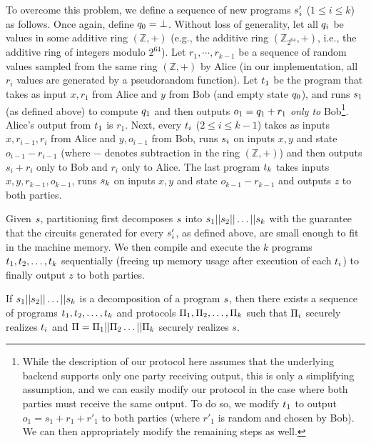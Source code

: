 To overcome this problem, we define a sequence of new programs
$s'_i$ ($1\leq i\leq k$) as follows. Once again, define $q_0
= \bot$. Without
loss of generality, let all $q_i$ be values in some additive ring
$(\mathbb{Z},+)$ (e.g., the additive ring $(\mathbb{Z}_{2^{64}},+)$,
i.e., the additive ring of integers modulo $2^{64}$).
Let $r_1,\cdots,r_{k-1}$ be a sequence of random values sampled from
the same ring $(\mathbb{Z},+)$ by Alice (in our implementation, all
$r_i$ values are generated by a pseudorandom function). Let $t_1$
be the program that takes as input $x,r_1$ from Alice and $y$ from Bob
(and empty state $q_0$), and runs $s_1$ (as defined above) to
compute $q_1$ and then outputs $o_1 = q_1 + r_1$ {\em only
  to} Bob\footnote{While the description of our protocol here assumes
  that
  the underlying backend supports only one party receiving output,
  this is only a simplifying assumption, and we can easily modify our
  protocol in the case where both parties must receive the same
  output. To do so, we modify $t_1$ to output $o_1 = s_1+r_1+r'_1$ to
  both parties (where $r'_1$ is random and chosen by Bob). We can then
  appropriately modify the remaining steps as well.}. Alice's output
from $t_1$ is $r_1$. Next, every $t_i$ ($2\leq i\leq k-1$)
takes as inputs $x,r_{i-1},r_i$ from Alice and $y,o_{i-1}$ from Bob,
runs $s_i$
on inputs $x,y$ and state $o_{i-1}-r_{i-1}$ (where $-$ denotes
subtraction in the ring $(\mathbb{Z},+)$) and then outputs $s_i+r_i$
only to Bob and $r_i$ only to Alice. The last
program $t_k$ takes inputs $x,y,r_{k-1},o_{k-1}$, runs $s_k$
on inputs $x,y$ and state $o_{k-1}-r_{k-1}$ and outputs $z$ to both
parties.

Given $s$, partitioning first decomposes $s$ into
$s_1||s_2||\dots||s_k$ with the guarantee that the
circuits generated for every $s'_i$, as defined above, are small
enough to fit in the machine memory. We then compile and execute the
$k$ programs $t_1,t_2,\ldots,t_k$ sequentially
(freeing up memory usage after execution of each $t_i$) to
finally output $z$ to both parties.



\begin{theorem}
If $s_1||s_2||\ldots||s_k$ is a decomposition of a program $s$, then there exists a sequence of programs $t_1, t_2, \ldots, t_k$ and protocols $\Pi_1, \Pi_2, \ldots, \Pi_k$ such that $\Pi_i$ securely realizes $t_i$ and  $\Pi
= \Pi_1||\Pi_2\dots||\Pi_k$ securely realizes $s$.
\end{theorem}

